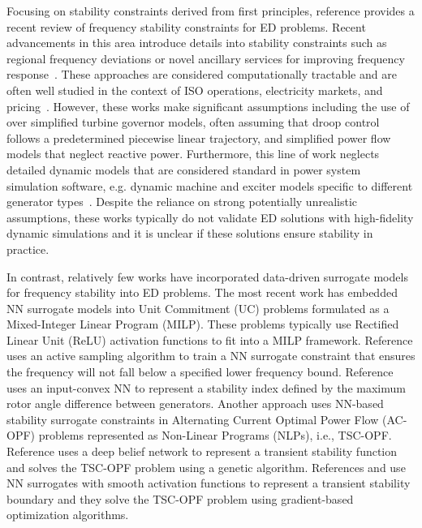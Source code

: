 \documentclass[lettersize,journal]{IEEEtran}
\begin{document}
Focusing on stability constraints derived from first principles, reference \cite{zhou2024review} provides a recent review of frequency stability constraints for ED problems.  Recent advancements in this area introduce details into stability constraints such as regional frequency deviations or novel ancillary services for improving frequency response~\cite{badesa2020conditions1,badesa2020conditions2,garcia2019real,trovato2018unit,zhang2020modeling}.  These approaches are considered computationally tractable and are often well studied in the context of ISO operations, electricity markets, and pricing~\cite{badesa2020pricing,badesa2022assigning,garcia2022Hawaii,garcia2021requirements}.  However, these works make significant assumptions including the use of over simplified turbine governor models, often assuming that droop control follows a predetermined piecewise linear trajectory, and simplified power flow models that neglect reactive power. Furthermore, this line of work neglects detailed dynamic models that are considered standard in power system simulation software, e.g. dynamic machine and exciter models specific to different generator types~\cite{PowerWorld,kundur1994power}. Despite the reliance on strong potentially unrealistic assumptions, these works typically do not validate ED solutions with high-fidelity dynamic simulations and it is unclear if these solutions ensure stability in practice.

In contrast, relatively few works have incorporated data-driven surrogate models for frequency stability into ED problems.  The most recent work has embedded NN surrogate models into Unit Commitment (UC) problems formulated as a Mixed-Integer Linear Program (MILP).  These problems typically use Rectified Linear Unit (ReLU) activation functions to fit into a MILP framework.  Reference \cite{zhang2021encoding} uses an active sampling algorithm to train a NN surrogate constraint that ensures the frequency will not fall below a specified lower frequency bound.  Reference \cite{wu2023transient} uses an input-convex NN to represent a stability index defined by the maximum rotor angle difference between generators. Another approach uses NN-based stability surrogate constraints in Alternating Current Optimal Power Flow (AC-OPF) problems represented as Non-Linear Programs (NLPs), i.e., TSC-OPF.  Reference \cite{su2021deep} uses a deep belief network to represent a transient stability function and solves the TSC-OPF problem using a genetic algorithm.  References \cite{ahmadi2013two} and \cite{gutierrez2010neural} use NN surrogates with smooth activation functions to represent a transient stability boundary and they solve the TSC-OPF problem using gradient-based optimization algorithms.
\end{document}
